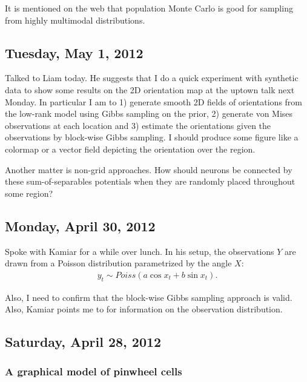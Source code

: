 \documentclass[11pt]{article}
\newcommand{\paperlink}[1]{\href{Documents/papers/#1.pdf}{\cite{#1}}}
\begin{document}
It is mentioned on the web that population Monte Carlo is good for sampling from highly multimodal distributions.

\subsection*{Tuesday, May 1, 2012}
Talked to Liam today. He suggests that I do a quick experiment with synthetic data to show some results on the 2D orientation map at the uptown talk next Monday. In particular I am to 1) generate smooth 2D fields of orientations from the low-rank model using Gibbs sampling on the prior, 2) generate von Mises observations at each location and 3) estimate the orientations given the observations by block-wise Gibbs sampling. I should produce some figure like a colormap or a vector field depicting the orientation over the region.

Another matter is non-grid approaches. How should neurons be connected by these sum-of-separables potentials when they are randomly placed throughout some region?

\subsection*{Monday, April 30, 2012}

Spoke with Kamiar for a while over lunch. In his setup, the observations $Y$ are drawn from a Poisson distribution parametrized by the angle $X$:
%
\begin{align*}
y_t \sim Poiss(a\cos x_t + b\sin x_t).
\end{align*}

\noindent Also, I need to confirm that the block-wise Gibbs sampling approach is valid. Also, Kamiar points me to \paperlink{Macke_2009} for information on the observation distribution.

\subsection*{Saturday, April 28, 2012}

\subsubsection*{A graphical model of pinwheel cells}
\end{document}
